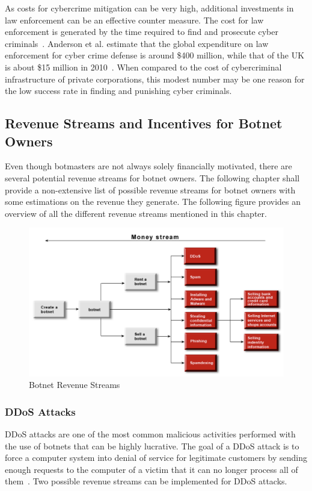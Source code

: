 As costs for cybercrime mitigation can be very high, additional investments in law enforcement can be an effective counter measure.
The cost for law enforcement is generated by the time required to find and prosecute cyber criminals~\cite{Anderson13}.
Anderson et al.\cite{Anderson13} estimate that the global expenditure on law enforcement for cyber crime defense is around \$400 million, while that of the UK is about \$15 million in 2010~\cite{Anderson13}.
When compared to the cost of cybercriminal infrastructure of private corporations, this modest number may be one reason for the low success rate in finding and punishing cyber criminals.

\subsection{Revenue Streams and Incentives for Botnet Owners}
Even though botmasters are not always solely financially motivated, there are several potential revenue streams for botnet owners.
The following chapter shall provide a non-extensive list of possible revenue streams for botnet owners with some estimations on the revenue they generate.
The following figure provides an overview of all the different revenue streams mentioned in this chapter.

\begin{figure}[ht]
\begin{center}
\includegraphics[scale=0.6]{Talk11/RevenueStreams}
\end{center}
\caption{Botnet Revenue Streams~\cite{Namestnikov09}}
\label{RevenueStreams}
\end{figure}

\subsubsection{DDoS Attacks}
DDoS attacks are one of the most common malicious activities performed with the use of botnets that can be highly lucrative.
The goal of a DDoS attack is to force a computer system into denial of service for legitimate customers by sending enough requests to the computer of a victim that it can no longer process all of them~\cite{Namestnikov09}.
Two possible revenue streams can be implemented for DDoS attacks.

